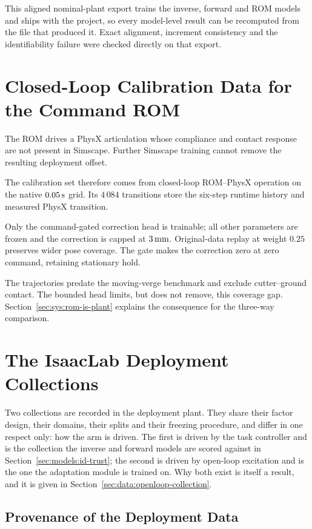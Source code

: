 This aligned nominal-plant export trains the inverse, forward and ROM models and
ships with the project, so every model-level result can be recomputed from the
file that produced it. Exact alignment, increment consistency and the
identifiability failure were checked directly on that export.


\section{Closed-Loop Calibration Data for the Command ROM}
\label{sec:data:rom-calibration}

The ROM drives a PhysX articulation whose compliance and contact response are
not present in Simscape. Further Simscape training cannot remove the resulting
deployment offset.

The calibration set therefore comes from closed-loop ROM--PhysX operation on
the native $\unit[0.05]{s}$ grid. Its $4\,084$ transitions store the six-step
runtime history and measured PhysX transition.

Only the command-gated correction head is trainable; all other parameters are
frozen and the correction is capped at $\unit[3]{mm}$. Original-data replay at
weight $0.25$ preserves wider pose coverage. The gate makes the correction
zero at zero command, retaining stationary hold.

The trajectories predate the moving-verge benchmark and exclude
cutter--ground contact. The bounded head limits, but does not remove, this
coverage gap. Section~\ref{sec:sys:rom-is-plant} explains the consequence for
the three-way comparison.

\section{The IsaacLab Deployment Collections}
\label{sec:data:isaaclab}

Two collections are recorded in the deployment plant. They share their factor
design, their domains, their splits and their freezing procedure, and differ in
one respect only: how the arm is driven. The first is driven by the task
controller and is the collection the inverse and forward models are scored
against in Section~\ref{sec:models:id-trust}; the second is driven by open-loop
excitation and is the one the adaptation module is trained on. Why both exist is
itself a result, and it is given in
Section~\ref{sec:data:openloop-collection}.

\subsection{Provenance of the Deployment Data}

